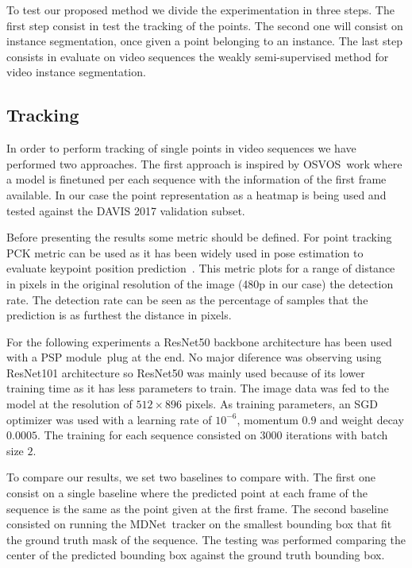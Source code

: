 To test our proposed method we divide the experimentation in three steps.
The first step consist in test the tracking of the points.
The second one will consist on instance segmentation, once given a point belonging to an instance.
The last step consists in evaluate on video sequences the weakly semi-supervised method for video instance segmentation.

\subsection{Tracking}

In order to perform tracking of single points in video sequences we have performed two approaches.
The first approach is inspired by OSVOS~\osvos work where a model is finetuned per each sequence with the information of the first frame available.
In our case the point representation as a heatmap is being used and tested against the DAVIS 2017 validation subset.

Before presenting the results some metric should be defined.
For point tracking PCK metric can be used as it has been widely used in pose estimation to evaluate keypoint position prediction~\pckmetric.
This metric plots for a range of distance in pixels in the original resolution of the image (480p in our case) the detection rate. The detection rate can be seen as the percentage of samples that the prediction is as furthest the distance in pixels.


For the following experiments a ResNet50 backbone architecture has been used with a PSP module~\pspnet plug at the end.
No major diference was observing using ResNet101 architecture so ResNet50 was mainly used because of its lower training time as it has less parameters to train.
The image data was fed to the model at the resolution of $512 \times 896$ pixels.
As training parameters, an SGD optimizer was used with a learning rate of $10^{-6}$, momentum $0.9$ and weight decay $0.0005$. The training for each sequence consisted on 3000 iterations with batch size $2$.

To compare our results, we set two baselines to compare with.
The first one consist on a single baseline where the predicted point at each frame of the sequence is the same as the point given at the first frame.
The second baseline consisted on running the MDNet~\mdnet tracker on the smallest bounding box that fit the ground truth mask of the sequence. The testing was performed comparing the center of the predicted bounding box against the ground truth bounding box.

